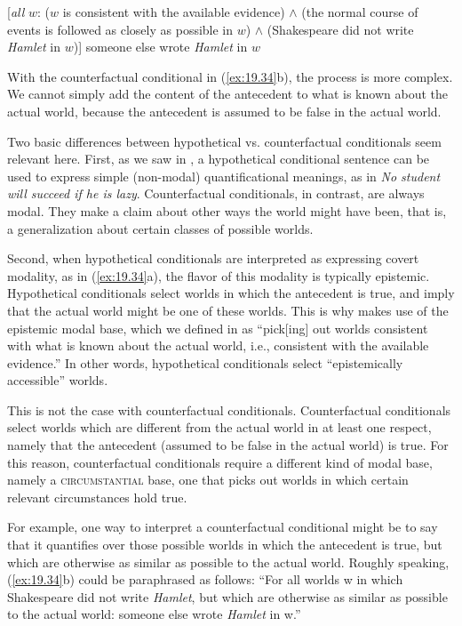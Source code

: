 \ea \label{ex:19.35}
{}[\textit{all} $w$: ($w$ is consistent with the available evidence) $\wedge$ (the normal course of events is followed as closely as possible in $w$) $\wedge$ (Shakespeare did not write \textit{Hamlet} in $w$)] someone else wrote \textit{Hamlet} in $w$
\z


With the counterfactual conditional in (\ref{ex:19.34}b), the process is more complex. We cannot simply add the content of the antecedent to what is known about the actual world, because the antecedent is assumed to be false in the actual world. 


Two basic differences between hypothetical vs. counterfactual  conditionals seem relevant here. First, as we saw in , a hypothetical conditional sentence can be used to express simple (non-modal) quantificational meanings, as in \textit{No student will succeed if he is lazy}. Counterfactual  conditionals, in contrast, are always modal. They make a claim about other ways the world might have been, that is, a generalization about certain classes of possible worlds.


Second, when hypothetical conditionals are interpreted as expressing covert modality, as in (\ref{ex:19.34}a), the flavor of this modality is typically epistemic. Hypothetical conditionals select worlds in which the antecedent is true, and imply that the actual world might be one of these worlds. This is why  makes use of the epistemic modal base, which we defined in  as “pick[ing] out worlds consistent with what is known about the actual world, i.e., consistent with the available evidence.” In other words, hypothetical conditionals select “epistemically accessible” worlds.


This is not the case with counterfactual  conditionals. Counterfactual  conditionals select worlds which are different from the actual world in at least one respect, namely that the antecedent (assumed to be false in the actual world) is true. For this reason, counterfactual  conditionals require a different kind of modal base, namely a \textsc{circumstantial} base, one that picks out worlds in which certain relevant circumstances hold true.


For example, one way to interpret a counterfactual  conditional might be to say that it quantifies over those possible worlds in which the antecedent is true, but which are otherwise as similar as possible to the actual world. Roughly speaking, (\ref{ex:19.34}b) could be paraphrased as follows: “For all worlds w in which Shakespeare did not write \textit{Hamlet}, but which are otherwise as similar as possible to the actual world: someone else wrote \textit{Hamlet} in w.”


